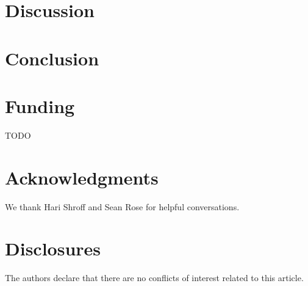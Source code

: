 \documentclass[10pt]{article}
\begin{document}
\section{Discussion}

\section{Conclusion}

\section*{Funding}
TODO

\section*{Acknowledgments}
We thank Hari Shroff and Sean Rose for helpful conversations. 

\section*{Disclosures}
The authors declare that there are no conflicts of interest related to this article.
\end{document}
